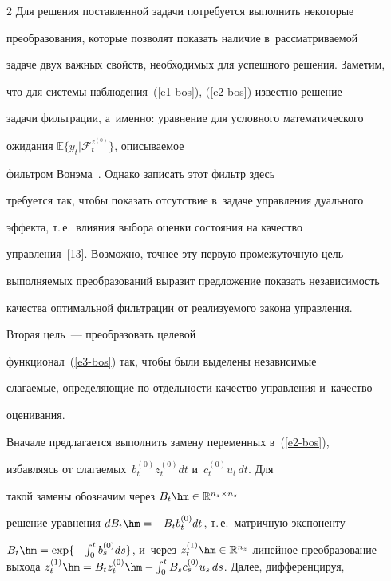 \begin{multicols}{2}
     Для решения поставленной задачи потребуется выполнить некоторые 


преобразования, которые позволят показать наличие в~рассматриваемой 


задаче двух важных свойств, необходимых для успешного решения. Заметим, 


что для системы наблюдения~(\ref{e1-bos}), (\ref{e2-bos}) известно решение 


задачи фильтрации, а~именно: уравнение для условного математического 


ожидания $\mathbb{E}\{y_t\vert \mathcal{F}_t^{z^{(0)}}\}$, описываемое 


фильтром Вонэма~\cite{11-bos}. Однако записать этот фильтр здесь 


требуется так, чтобы показать отсутствие в~задаче управления дуального 


эффекта, т.\,е.\ влияния выбора оценки состояния на качество 


управления~[13]. Возможно, точнее эту первую промежуточную цель 


выполняемых преобразований выразит предложение показать независимость 


качества оптимальной фильтрации от реализуемого закона управления. 


Вторая цель~--- преобразовать целевой  


функционал~(\ref{e3-bos}) так, чтобы были выделены независимые 


слагаемые, определяющие по отдельности качество управления и~качество 


оценивания.


     


     Вначале предлагается выполнить замену переменных в~(\ref{e2-bos}), 


избавляясь от слагаемых~$b_t^{(0)} z_t^{(0)}dt$ и~$c_t^{(0)} u_t \,dt$. Для 


такой замены обозначим через $B_t\hm\in \mathbb{R}^{n_z\times n_z}$ 


решение уравнения $dB_t\hm= -B_t b_t^{(0)} dt$, т.\,е.\ матричную экспоненту 


$B_t\hm= \exp \{ -\int\nolimits_0^t b_s^{(0)}ds\}$, и~через $z_t^{(1)}\hm\in 


\mathbb{R}^{n_z}$ линейное преобразование выхода $z_t^{(1)}\hm= B_t 


z_t^{(0)} \hm- \int\nolimits_0^t B_s c_s^{(0)} u_s\, ds$. Далее, дифференцируя,  



\end{multicols}
